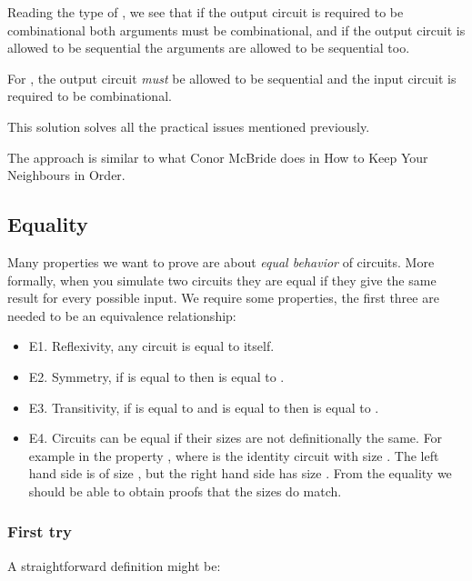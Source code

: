 
Reading the type of , we see that if the output circuit is
required to be combinational both arguments must be combinational, and
if the output circuit is allowed to be sequential the arguments are
allowed to be sequential too.

For , the output circuit \emph{must} be allowed to be
sequential and the input circuit is required to be combinational.

This solution solves all the practical issues mentioned previously.

The approach is similar to what Conor McBride does in How to Keep
Your Neighbours in Order\cite{mcbride14}.

\subsection{Equality}\label{equality}

Many properties we want to prove are about \emph{equal behavior} of
circuits. More formally, when you simulate two circuits they are equal
if they give the same result for every possible input. We require some
properties, the first three are needed to be an equivalence
relationship:

\begin{itemize}
\item E1. Reflexivity, any circuit is equal to itself.
\item E2. Symmetry, if  is equal to  then  is equal
  to .
\item E3. Transitivity, if  is equal to  and  is
  equal to  then  is equal to .
\item E4. Circuits can be equal if their sizes are not definitionally
  the same.
For example in the property     
, where   is the identity circuit with size .
The left hand side is of size  \AF{+} , but the right hand
side has size .
From the equality we should be able to obtain proofs that the sizes do
match.
\end{itemize}

\subsubsection{First try}\label{first-try}

A straightforward definition might be:

